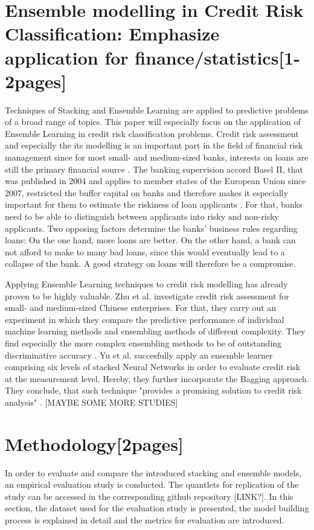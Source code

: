 \documentclass[12pt]{article}
\begin{document}
\section{Ensemble modelling in Credit Risk Classification: Emphasize application for finance/statistics[1-2pages]}
Techniques of Stacking and Ensemble Learning are applied to predictive problems of a broad range of topics. This paper will especially focus on the application of Ensemble Learning in credit risk classification problems. Credit risk assessment and especially the its modelling is an important part in the field of financial risk management since for most small- and medium-sized banks, interests on loans are still the primary financial source \citep[p.2]{jacobson2006internal}. The banking supervision accord Basel II, that was published in 2004 and applies to member states of the European Union since 2007, restricted the buffer capital on banks and therefore makes it especially important for them to estimate the riskiness of loan applicants \citep{basel2}. For that, banks need to be able to distinguish between applicants into risky and non-risky applicants. Two opposing factors determine the banks' business rules regarding loans: On the one hand, more loans are better. On the other hand, a bank can not afford to make to many bad loans, since this would eventually lead to a collapse of the bank. A good strategy on loans will therefore be a compromise. 

Applying Ensemble Learning techniques to credit risk modelling has already proven to be highly valuable. Zhu et al. \citeyear{zhu2017comparison} investigate credit risk assessment for small- and medium-sized Chinese enterprises. For that, they carry out an experiment in which they compare the predictive performance of individual machine learning methods and ensembling methods of different complexity. They find especially the more complex ensembling methods to be of outstanding discriminative accuracy \citep[p.46f.]{zhu2017comparison}. Yu et al. \citeyear{yu2008credit} succesfully apply an ensemble learner comprising six levels of stacked Neural Networks in order to evaluate credit risk at the measurement level. Hereby, they further incorporate the Bagging approach. They conclude, that such technique "provides a promising solution to credit risk analysis" \citep[p.1443]{yu2008credit}. [MAYBE SOME MORE STUDIES]




\section{Methodology[2pages]}
In order to evaluate and compare the introduced stacking and ensemble models, an empirical evaluation study is conducted. The quantlets for replication of the study can be accessed in the corresponding github repository [LINK?]. In this section, the dataset used for the evaluation study is presented, the model building process is explained in detail and the metrics for evaluation are introduced.
\end{document}
